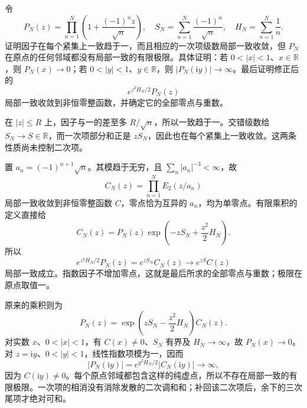 \BookExercises

\begin{exercise}[二次修正不能省去]\label{b3:ex:20-draft-01}
令
\[
 P_N(z)=\prod_{n=1}^N\left(1+\frac{(-1)^nz}{\sqrt n}\right),\quad
 S_N=\sum_{n=1}^N\frac{(-1)^n}{\sqrt n},\quad
 H_N=\sum_{n=1}^N\frac1n.
\]
证明因子在每个紧集上一致趋于一，而且相应的一次项级数局部一致收敛，但 \(P_N\) 在原点的任何邻域都没有局部一致的有限极限。具体证明：若 \(0<|x|<1\)、\(x\in\mathbb R\)，则 \(P_N(x)\to0\)；若 \(0<|y|<1\)、\(y\in\mathbb R\)，则 \(|P_N(\mathrm iy)|\to\infty\)。最后证明修正后的
\[
 e^{z^2H_N/2}P_N(z)
\]
局部一致收敛到非恒零整函数，并确定它的全部零点与重数。
\end{exercise}
\begin{solution}
在 \(|z|\le R\) 上，因子与一的差至多 \(R/\sqrt n\)，所以一致趋于一。交错级数给 \(S_N\to S\in\mathbb R\)，而一次项部分和正是 \(zS_N\)，因此也在每个紧集上一致收敛。这两条性质尚未控制二次项。

置 \(a_n=(-1)^{n+1}\sqrt n\)。其模趋于无穷，且 \(\sum_n|a_n|^{-3}<\infty\)，故
\[
 C_N(z)=\prod_{n=1}^NE_2(z/a_n)
\]
局部一致收敛到非恒零整函数 \(C\)，零点恰为互异的 \(a_n\)，均为单零点。有限乘积的定义直接给
\[
 C_N(z)=P_N(z)\exp\left(-zS_N+\frac{z^2}2H_N\right).
\]
所以
\[
 e^{z^2H_N/2}P_N(z)=e^{zS_N}C_N(z)
 \longrightarrow e^{zS}C(z)
\]
局部一致成立。指数因子不增加零点，这就是最后所求的全部零点与重数；极限在原点取值一。

原来的乘积则为
\[
 P_N(z)=\exp\left(zS_N-\frac{z^2}2H_N\right)C_N(z).
\]
对实数 \(x\)、\(0<|x|<1\)，有 \(C(x)\ne0\)、\(S_N\) 有界及 \(H_N\to\infty\)，故 \(P_N(x)\to0\)。对 \(z=\mathrm iy\)、\(0<|y|<1\)，线性指数项模为一，因而
\[
 |P_N(\mathrm iy)|=e^{y^2H_N/2}|C_N(\mathrm iy)|\longrightarrow\infty,
\]
因为 \(C(\mathrm iy)\ne0\)。每个原点邻域都包含这样的纯虚点，所以不存在局部一致的有限极限。一次项的相消没有消除发散的二次调和和；补回该二次项后，余下的三次尾项才绝对可和。
\end{solution}

